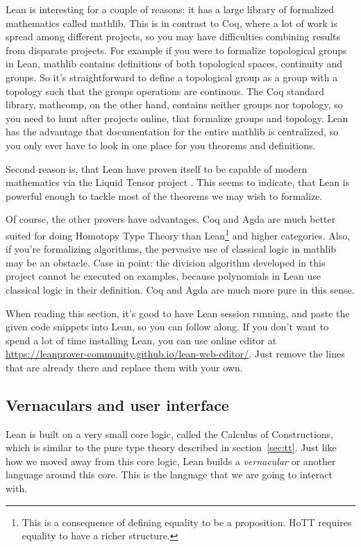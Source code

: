 \documentclass[a4paper, 12pt]{article}
\theoremstyle{changedot}
\theoremstyle{changedotbreak}
\theoremstyle{nonumberplain}
\begin{document}
Lean is interesting for a couple of reasons: it has a large library of formalized mathematics called mathlib. This is in contrast to Coq, where a lot of work is spread among different projects, so you may have difficulties combining results from disparate projects. For example if you were to formalize topological groups in Lean, mathlib contains definitions of both topological spaces, continuity and groups. So it's straightforward to define a topological group as a group with a topology such that the groups operations are continous. The Coq standard library, mathcomp, on the other hand, contains neither groups nor topology, so you need to hunt after projects online, that formalize groups and topology. Lean has the advantage that documentation for the entire mathlib is centralized, so you only ever have to look in one place for you theorems and definitions.

Second reason is, that Lean have proven itself to be capable of modern mathematics via the Liquid Tensor project \cite{LiquidTensor}. This seems to indicate, that Lean is powerful enough to tackle most of the theorems we may wish to formalize.

Of course, the other provers have advantages. Coq and Agda are much better suited for doing Homotopy Type Theory than Lean\footnote{This is a consequence of defining equality to be a proposition. HoTT requires equality to have a richer structure.}  and higher categories. Also, if you're formalizing algorithms, the pervasive use of classical logic in mathlib may be an obstacle. Case in point: the division algorithm developed in this project cannot be executed on examples, because polynomials in Lean use classical logic in their definition. Coq and Agda are much more pure in this sense.

When reading this section, it's good to have Lean session running, and paste the given code snippets into Lean, so you can follow along. If you don't want to spend a lot of time installing Lean, you can use online editor at \url{https://leanprover-community.github.io/lean-web-editor/}. Just remove the lines that are already there and replace them with your own.

\subsection{Vernaculars and user interface}
Lean is built on a very small core logic, called the Calculus of Constructions, which is similar to the pure type theory described in section~\ref{sec:tt}. Just like how we moved away from this core logic, Lean builds a \textit{vernacular} or another language around this core. This is the language that we are going to interact with.
\end{document}
